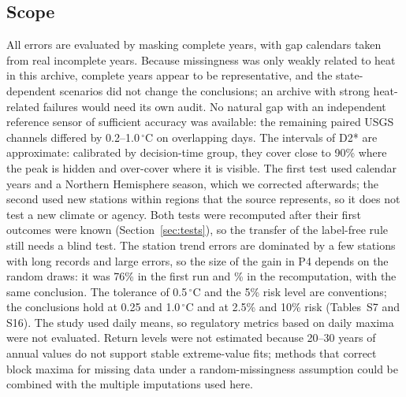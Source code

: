 \documentclass[draft]{agujournal2025}
\begin{document}
\subsection{Scope}
All errors are evaluated by masking complete years, with gap calendars taken from real incomplete years. Because missingness was only weakly related to heat in this archive, complete years appear to be representative, and the state-dependent scenarios did not change the conclusions; an archive with strong heat-related failures would need its own audit. No natural gap with an independent reference sensor of sufficient accuracy was available: the remaining paired USGS channels differed by 0.2--1.0\,$^{\circ}$C on overlapping days. The intervals of D2* are approximate: calibrated by decision-time group, they cover close to 90\% where the peak is hidden and over-cover where it is visible. The first test used calendar years and a Northern Hemisphere season, which we corrected afterwards; the second used new stations within regions that the source represents, so it does not test a new climate or agency. Both tests were recomputed after their first outcomes were known (Section~\ref{sec:tests}), so the transfer of the label-free rule still needs a blind test. The station trend errors are dominated by a few stations with long records and large errors, so the size of the gain in P4 depends on the random draws: it was 76\% in the first run and \TTrendReductionRone\% in the recomputation, with the same conclusion. The tolerance of 0.5\,$^{\circ}$C and the 5\% risk level are conventions; the conclusions hold at 0.25 and 1.0\,$^{\circ}$C and at 2.5\% and 10\% risk (Tables~S7 and S16). The study used daily means, so regulatory metrics based on daily maxima were not evaluated. Return levels were not estimated because 20--30 years of annual values do not support stable extreme-value fits; methods that correct block maxima for missing data under a random-missingness assumption \cite{simpson2026} could be combined with the multiple imputations used here.
\end{document}
